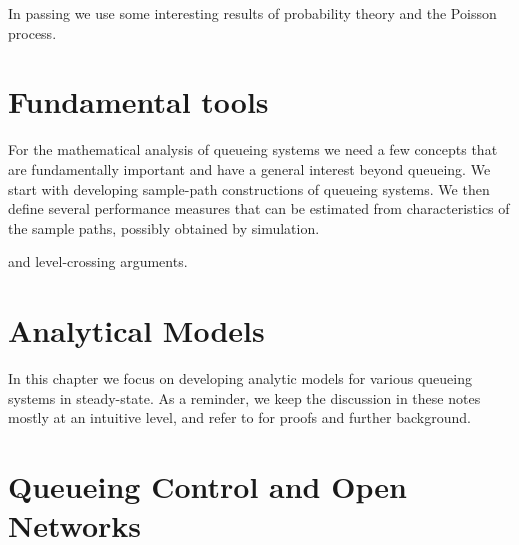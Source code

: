 In passing we use some interesting results of probability theory and the Poisson process. 





%


\chapter{Fundamental tools}
\label{cha:fundamental-tools}

For the mathematical analysis of queueing systems we need a few concepts that are fundamentally important and have a general interest beyond queueing.
We start with developing sample-path constructions of queueing systems.
We then define several performance measures that can be estimated from characteristics of the sample paths, possibly obtained by simulation.

 and level-crossing arguments.










\chapter{Analytical Models}
\label{cha:analytical-models}

In this chapter we focus on developing analytic models for various queueing systems in steady-state.
As a reminder, we keep the discussion in these notes mostly at an intuitive level, and refer to \cite{el-taha98:_sampl_path_analy_queuein_system} for proofs and further background.







% 
%


\chapter{Queueing Control and Open Networks}
\label{cha:queu-contr-open}


